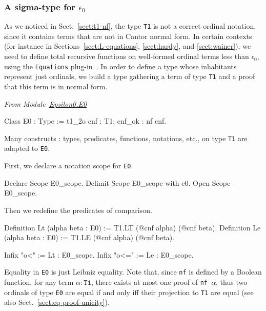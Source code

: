   
\subsubsection{A sigma-type for \texorpdfstring{$\epsilon_0$}{epsilon0}}

As we noticed in Sect.~\ref{sect:t1-nf}, the type \texttt{T1} is not a correct ordinal notation, since it contains terms that are not in Cantor normal form. In certain contexts (for instance in Sections~\ref{sect:L-equations}, \ref{sect:hardy},
and \ref{sect:wainer}),  we need to define total recursive functions on well-formed ordinal terms less  than $\epsilon_0$, using the \texttt{Equations} plug-in~\cite{sozeau:hal-01671777}.
 In order to define a type whose inhabitants represent just ordinals, we build a type gathering a term of type \texttt{T1} and a proof that this term is in normal form.
 

\label{sect:E0-def}
\label{types:E0}

\emph{From Module~\href{../theories/html/hydras.Epsilon0.E0.html}{Epsilon0.E0}}



\begin{Coqsrc}
Class E0 : Type := t1_2o {cnf : T1; cnf_ok : nf cnf}.
\end{Coqsrc}

Many constructs : types, predicates, functions, notations, etc., on type \texttt{T1} are adapted to \texttt{E0}.

First, we declare a notation scope for \texttt{E0}.

\begin{Coqsrc}
Declare Scope E0_scope.
Delimit Scope E0_scope with e0.
Open Scope E0_scope.
\end{Coqsrc}

Then we redefine the predicates of comparison.

\label{Predicates:Lt-E0}

\begin{Coqsrc}
Definition Lt (alpha beta : E0) := T1.LT (@cnf alpha) (@cnf beta).
Definition Le (alpha beta : E0) := T1.LE (@cnf alpha) (@cnf beta).

Infix "o<" := Lt : E0_scope.
Infix "o<=" := Le : E0_scope.
\end{Coqsrc}
  

Equality in \texttt{E0} is just Leibniz equality. Note that, since \texttt{nf} is
defined by a Boolean function, for  any term $\alpha:\texttt{T1}$, there exists at most one proof of \texttt{nf $\alpha$}, thus two ordinals of type \texttt{E0} are
equal if and only iff their projection to \texttt{T1} are equal (see also Sect.~\vref{sect:eq-proof-unicity}).

